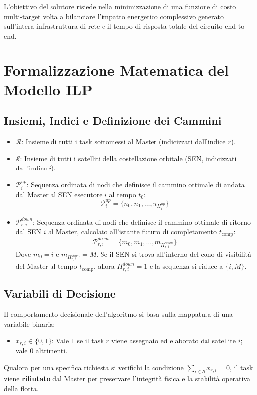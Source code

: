 \documentclass[12pt]{article}
\begin{document}
L'obiettivo del solutore risiede nella minimizzazione di una funzione di costo multi-target volta a bilanciare l'impatto energetico complessivo generato sull'intera infrastruttura di rete e il tempo di risposta totale del circuito end-to-end.

\section{Formalizzazione Matematica del Modello ILP}

\subsection{Insiemi, Indici e Definizione dei Cammini}
\begin{itemize}
    \item $\mathcal{R}$: Insieme di tutti i task sottomessi al Master (indicizzati dall'indice $r$).
    \item $\mathcal{S}$: Insieme di tutti i satelliti della costellazione orbitale (SEN, indicizzati dall'indice $i$).
    \item $\mathcal{P}_i^{up}$: Sequenza ordinata di nodi che definisce il cammino ottimale di andata dal Master al SEN esecutore $i$ al tempo $t_0$:
    \begin{equation}
    \mathcal{P}_i^{up} = \{n_0, n_1, \dots, n_{H_i^{up}}\}
    \end{equation}
    \item $\mathcal{P}_{r,i}^{down}$: Sequenza ordinata di nodi che definisce il cammino ottimale di ritorno dal SEN $i$ al Master, calcolato all'istante futuro di completamento $t_{\text{comp}}$:
    \begin{equation}
    \mathcal{P}_{r,i}^{down} = \{m_0, m_1, \dots, m_{H_{r,i}^{down}}\}
    \end{equation}
    Dove $m_0 = i$ e $m_{H_{r,i}^{down}} = M$. Se il SEN si trova all'interno del cono di visibilit\`a del Master al tempo $t_{\text{comp}}$, allora $H_{r,i}^{down} = 1$ e la sequenza si riduce a $\{i, M\}$.
\end{itemize}

\subsection{Variabili di Decisione}
Il comportamento decisionale dell'algoritmo si basa sulla mappatura di una variabile binaria:
\begin{itemize}
    \item $x_{r,i} \in \{0, 1\}$: Vale $1$ se il task $r$ viene assegnato ed elaborato dal satellite $i$; vale $0$ altrimenti.
\end{itemize}
Qualora per una specifica richiesta si verifichi la condizione $\sum_{i \in \mathcal{S}} x_{r,i} = 0$, il task viene \textbf{rifiutato} dal Master per preservare l'integrit\`a fisica e la stabilità operativa della flotta.
\end{document}
